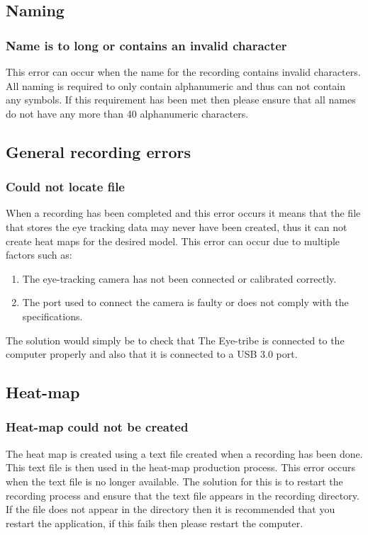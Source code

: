 \subsection{Naming}
\subsubsection{Name is to long or contains an invalid character}
This error can occur when the name for the recording contains invalid characters. All naming is required to only contain alphanumeric and thus can not contain any symbols. If this requirement has been met then please ensure that all names do not have any more than 40 alphanumeric characters.

\subsection{General recording errors}
\subsubsection{Could not locate file}
When a recording has been completed and this error occurs it means that the file that stores the eye tracking data may never have been created, thus it can not create heat maps for the desired model. This error can occur due to multiple factors such as:
\begin{enumerate}
\item The eye-tracking camera has not been connected or calibrated correctly.
\item The port used to connect the camera is faulty or does not comply with the specifications.
\end{enumerate}
The solution would simply be to check that The Eye-tribe is connected to the computer properly and also that it is connected to a USB 3.0 port.

\subsection{Heat-map}
\subsubsection{Heat-map could not be created}
The heat map is created using a text file created when a recording has been done. This text file is then used in the heat-map production process. This error occurs when the text file is no longer available. The solution for this is to restart the recording process and ensure that the text file appears in the recording directory. If the file does not appear in the directory then it is recommended that you restart the application, if this fails then please restart the computer.

